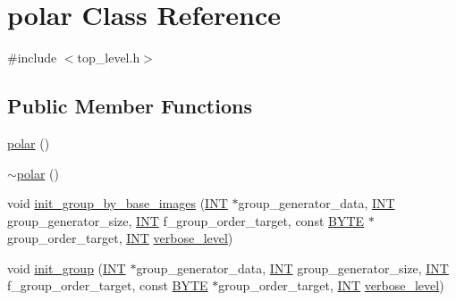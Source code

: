 \hypertarget{classpolar}{}\section{polar Class Reference}
\label{classpolar}


{\ttfamily \#include $<$top\+\_\+level.\+h$>$}

\subsection*{Public Member Functions}
\begin{DoxyCompactItemize}
\item 
\mbox{\hyperlink{classpolar_a26d3263474b5702ee2083e39decd8aa5}{polar}} ()
\item 
\mbox{\hyperlink{classpolar_a0259a52095fc622c3ba59292a4848f1a}{$\sim$polar}} ()
\item 
void \mbox{\hyperlink{classpolar_aab2c4c97ea76d9d06cbbbf61dd9e76bd}{init\+\_\+group\+\_\+by\+\_\+base\+\_\+images}} (\mbox{\hyperlink{galois_8h_a09fddde158a3a20bd2dcadb609de11dc}{I\+NT}} $\ast$group\+\_\+generator\+\_\+data, \mbox{\hyperlink{galois_8h_a09fddde158a3a20bd2dcadb609de11dc}{I\+NT}} group\+\_\+generator\+\_\+size, \mbox{\hyperlink{galois_8h_a09fddde158a3a20bd2dcadb609de11dc}{I\+NT}} f\+\_\+group\+\_\+order\+\_\+target, const \mbox{\hyperlink{galois_8h_ab6cc7b4aeb6ea31aba2b3fbfc83ff5e6}{B\+Y\+TE}} $\ast$group\+\_\+order\+\_\+target, \mbox{\hyperlink{galois_8h_a09fddde158a3a20bd2dcadb609de11dc}{I\+NT}} \mbox{\hyperlink{simeon_8_c_a818073fbcc2f439e7c56952f67386122}{verbose\+\_\+level}})
\item 
void \mbox{\hyperlink{classpolar_a72edbe4cf3d44b38de4038fa89270c69}{init\+\_\+group}} (\mbox{\hyperlink{galois_8h_a09fddde158a3a20bd2dcadb609de11dc}{I\+NT}} $\ast$group\+\_\+generator\+\_\+data, \mbox{\hyperlink{galois_8h_a09fddde158a3a20bd2dcadb609de11dc}{I\+NT}} group\+\_\+generator\+\_\+size, \mbox{\hyperlink{galois_8h_a09fddde158a3a20bd2dcadb609de11dc}{I\+NT}} f\+\_\+group\+\_\+order\+\_\+target, const \mbox{\hyperlink{galois_8h_ab6cc7b4aeb6ea31aba2b3fbfc83ff5e6}{B\+Y\+TE}} $\ast$group\+\_\+order\+\_\+target, \mbox{\hyperlink{galois_8h_a09fddde158a3a20bd2dcadb609de11dc}{I\+NT}} \mbox{\hyperlink{simeon_8_c_a818073fbcc2f439e7c56952f67386122}{verbose\+\_\+level}})
\item 

\end{DoxyCompactItemize}
